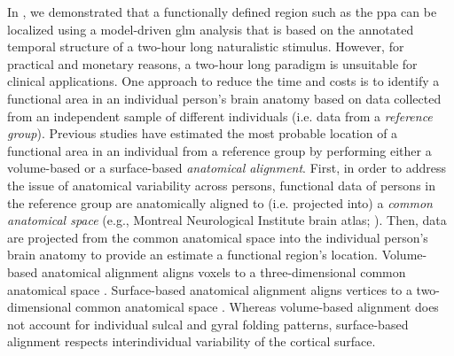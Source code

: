 In \citet{haeusler2022processing}, we demonstrated that a functionally defined
region such as the \ac{ppa} can be localized using a model-driven \ac{glm}
analysis that is based on the annotated temporal structure of a two-hour long
naturalistic stimulus.
However, for practical and monetary reasons, a two-hour long paradigm is
unsuitable for clinical applications.
One approach to reduce the time and costs is to identify a functional area in an
individual person's brain anatomy based on data collected from an independent
sample of different individuals (i.e. data from a \textit{reference group}).
Previous studies have estimated the most probable location of a functional area
in an individual from a reference group by performing either a volume-based
\citep[e.g.,][]{zhen2017quantifying, zhen2015quantifying} or a surface-based
\citep[e.g.,][]{frost2012measuring, weiner2018defining,
rosenke2021probabilistic, wang2015probabilistic} \textit{anatomical alignment}.
%
First, in order to address the issue of anatomical variability across persons,
functional data of persons in the reference group are anatomically aligned to
(i.e.  projected into) a \textit{common anatomical space} (e.g., Montreal
Neurological Institute brain atlas; \citep[MNI152,][]{fonov2011unbiased}).
Then, data are projected from the common anatomical space into the individual
person's brain anatomy to provide an estimate a functional region's location.
Volume-based anatomical alignment \citep[s.][for a review]{klein2009evaluation}
aligns voxels to a three-dimensional common anatomical space \citep[e.g., MNI152
atlas;][]{fonov2011unbiased}.
Surface-based anatomical alignment \citep{fischl1999cortical, yeo2009spherical}
aligns vertices to a two-dimensional common anatomical space \citep[e.g.,
FreeSurfer's fsaverage template;][]{fischl1999high}.
Whereas volume-based alignment does not account for individual sulcal and gyral
folding patterns, surface-based alignment respects interindividual variability
of the cortical surface.
